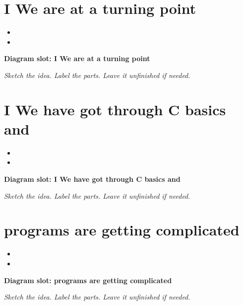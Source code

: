 \documentclass[14pt]{extarticle}
\begin{document}
\section{I We are at a turning point}
\begin{itemize}[leftmargin=*]
  \item \hrulefill
  \vspace{2.4em}
  \item \hrulefill
  \vspace{2.4em}
\end{itemize}
\noindent\textbf{Diagram slot: I We are at a turning point}
\begin{framed}
\begin{minipage}[t][0.22\textheight]{\textwidth}
\vspace{0.4em}
\textit{Sketch the idea. Label the parts. Leave it unfinished if needed.}
\end{minipage}
\end{framed}
\vspace{1em}
\section{I We have got through C basics and}
\begin{itemize}[leftmargin=*]
  \item \hrulefill
  \vspace{2.4em}
  \item \hrulefill
  \vspace{2.4em}
\end{itemize}
\noindent\textbf{Diagram slot: I We have got through C basics and}
\begin{framed}
\begin{minipage}[t][0.22\textheight]{\textwidth}
\vspace{0.4em}
\textit{Sketch the idea. Label the parts. Leave it unfinished if needed.}
\end{minipage}
\end{framed}
\vspace{1em}
\section{programs are getting complicated}
\begin{itemize}[leftmargin=*]
  \item \hrulefill
  \vspace{2.4em}
  \item \hrulefill
  \vspace{2.4em}
\end{itemize}
\noindent\textbf{Diagram slot: programs are getting complicated}
\begin{framed}
\begin{minipage}[t][0.22\textheight]{\textwidth}
\vspace{0.4em}
\textit{Sketch the idea. Label the parts. Leave it unfinished if needed.}
\end{minipage}
\end{framed}
\vspace{1em}
\end{document}
